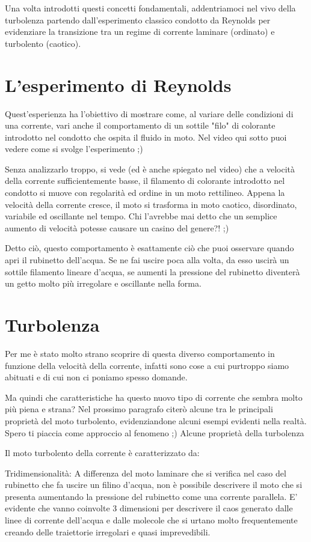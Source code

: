 Una volta introdotti questi concetti fondamentali, addentriamoci nel vivo della turbolenza partendo dall'esperimento classico condotto da Reynolds per evidenziare la transizione tra un regime di corrente laminare (ordinato) e turbolento (caotico).

\section{L'esperimento di Reynolds}

Quest'esperienza ha l'obiettivo di mostrare come, al variare delle condizioni di una corrente, vari anche il comportamento di un sottile "filo" di colorante introdotto nel condotto che ospita il fluido in moto. Nel video qui sotto puoi vedere come si svolge l'esperimento ;)


Senza analizzarlo troppo, si vede (ed è anche spiegato nel video) che a velocità della corrente sufficientemente basse, il filamento di colorante introdotto nel condotto si muove con regolarità ed ordine in un moto rettilineo. Appena la velocità della corrente cresce, il moto si trasforma in moto caotico, disordinato, variabile ed oscillante nel tempo. Chi l'avrebbe mai detto che un semplice aumento di velocità potesse causare un casino del genere?! ;)

Detto ciò, questo comportamento è esattamente ciò che puoi osservare quando apri il rubinetto dell'acqua. Se ne fai uscire poca alla volta, da esso uscirà un sottile filamento lineare d'acqua, se aumenti la pressione del rubinetto diventerà un getto molto più irregolare e oscillante nella forma.

\section{Turbolenza}

Per me è stato molto strano scoprire di questa diverso comportamento in funzione della velocità della corrente, infatti sono cose a cui purtroppo siamo abituati e di cui non ci poniamo spesso domande.

Ma quindi che caratteristiche ha questo nuovo tipo di corrente che sembra molto più piena e strana? Nel prossimo paragrafo citerò alcune tra le principali proprietà del moto turbolento, evidenziandone alcuni esempi evidenti nella realtà. Spero ti piaccia come approccio al fenomeno ;)
Alcune proprietà della turbolenza

Il moto turbolento della corrente è caratterizzato da:

Tridimensionalità: A differenza del moto laminare che si verifica nel caso del rubinetto che fa uscire un filino d'acqua, non è possibile descrivere il moto che si presenta aumentando la pressione del rubinetto come una corrente parallela. E' evidente che vanno coinvolte 3 dimensioni per descrivere il caos generato dalle linee di corrente dell'acqua e dalle molecole che si urtano molto frequentemente creando delle traiettorie irregolari e quasi imprevedibili.

